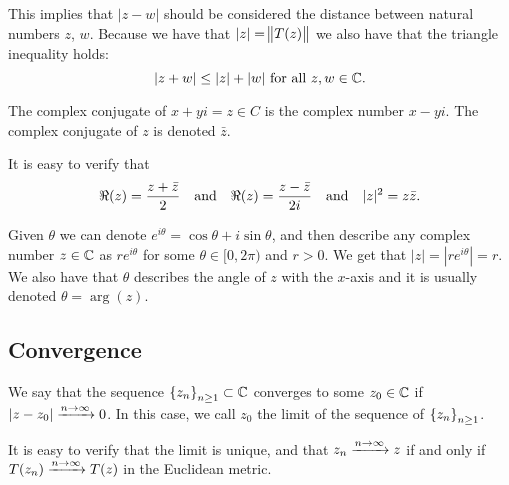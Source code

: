 \documentclass[11pt,a4paper]{article}
\begin{document}
This implies that $|z - w|$ should be considered the distance between natural
numbers $z$, $w$.
Because we have that $|z| = \norm{T(z)}$ we also have that the triangle
inequality holds:
\[
    |z + w| \le |z| + |w| \text{ for all } z,w \in \mathbb{C}.
\]

\begin{definition}
    The complex conjugate of $x + y i = z \in C$ is the complex number
    $x - y i$. The complex conjugate of $z$ is denoted $\bar{z}$.
\end{definition}

\begin{center}
\end{center}

It is easy to verify that
\[
    \Re(z) = \frac{z + \bar{z}}{2} \quad \text{and} \quad 
    \Re(z) = \frac{z - \bar{z}}{2 i} \quad \text{and} \quad
    |z|^2 = z \bar{z}.
\]

Given $\theta$ we can denote $e^{i \theta} = \cos \theta + i \sin \theta$,
and then describe any complex number $z \in \mathbb{C}$ as $r e^{i \theta}$
for some $\theta \in [0, 2\pi)$ and $r > 0$.
We get that $|z| = |r e^{i \theta}| = r$.
We also have that $\theta$ describes the angle of $z$ with the $x$-axis
and it is usually denoted $\theta = \arg(z)$.

\subsection{Convergence}

\begin{definition}[Convergence]
    We say that the sequence $\set{z_n}_{n \geq 1} \subset \mathbb{C}$ converges
    to some $z_0 \in \mathbb{C}$ if $|z - z_0| \xrightarrow{n \to \infty} 0$.
    In this case, we call $z_0$ the limit of the sequence of
    $\set{z_n}_{n \geq 1}$.
\end{definition}

\begin{remark}
    It is easy to verify that the limit is unique, and that
    $z_n \xrightarrow{n \to \infty} z$ if and only if
    $T(z_n) \xrightarrow{n \to \infty} T(z)$ in the Euclidean metric.
\end{remark}
\end{document}
